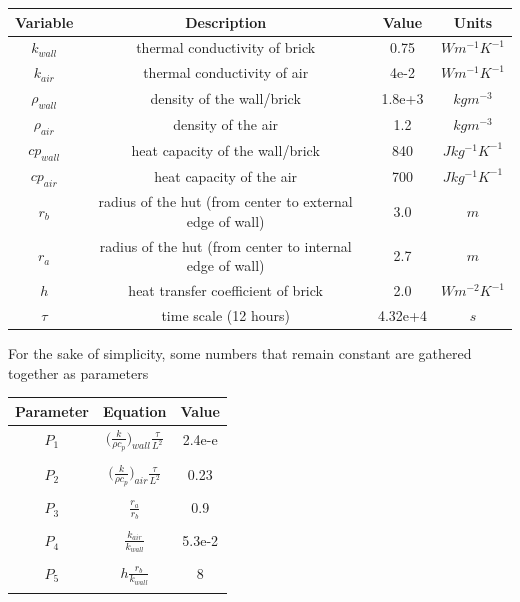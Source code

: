 \documentclass{article}
\begin{document}
\begin{center}
    \begin{tabular}{|c|c|c|c|}
    \hline
        Variable & Description & Value & Units \\ \hline
        $k_{wall}$  & thermal conductivity of brick& 0.75 & $W m^{-1} K^{-1}$ \\
        $k_{air}$   & thermal conductivity of air& 4e-2 & $W m^{-1} K^{-1}$   \\
        $\rho_{wall}$& density of the wall/brick& 1.8e+3 & $kg m^{-3}$       \\
        $\rho_{air}$ & density of the air& 1.2 & $kg m^{-3}$                 \\
        $cp_{wall}$ & heat capacity of the wall/brick& 840 & $J kg^{-1} K^{-1}$ \\ 
        $cp_{air}$  & heat capacity of the air& 700 & $J kg^{-1} K^{-1}$       \\
        $r_b$     & radius of the hut (from center to external edge of wall) & 3.0 & $m$ \\
        $r_a$     & radius of the hut (from center to internal edge of wall) & 2.7 & $m$ \\
        $h$    & heat transfer coefficient of brick& 2.0 & $W  m^{-2}  K^{-1}$            \\
        $\tau$     & time scale (12 hours)& 4.32e+4 & $s$                                 \\
        \hline
    \end{tabular}
\end{center}


For the sake of simplicity, some numbers that remain constant are gathered together as parameters

\begin{center}
    \begin{tabular}{c c c}
        \textbf{Parameter} & \textbf{Equation} & \textbf{Value}  \\ \hline
        $P_1$ & $\big(\frac{k}{\rho c_p}\big)_{wall} \frac{\tau}{L^2}$ & 2.4e-e \\ & & \\
        $P_2$ & $\big(\frac{k}{\rho c_p}\big)_{air} \frac{\tau}{L^2}$  & 0.23   \\ & & \\
        $P_3$ & $\frac{r_a}{r_b}$                       & 0.9    \\ & & \\
        $P_4$ & $\frac{k_{air}}{k_{wall}}$              & 5.3e-2 \\ & & \\
        $P_5$ & $h \frac{r_b}{k_{wall}}$                  & 8      \\ & & \\
    \end{tabular}
\end{center}
\end{document}
